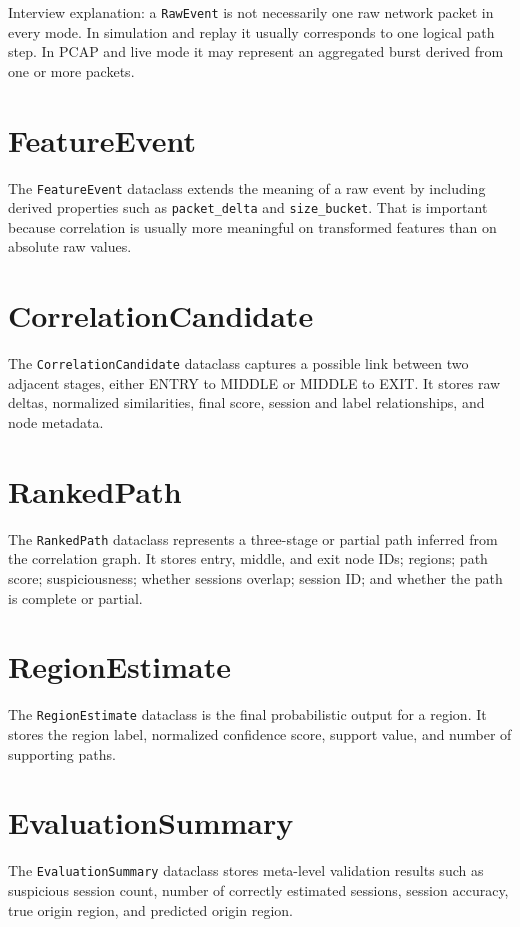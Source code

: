 \documentclass[12pt,a4paper]{report}
\begin{document}
Interview explanation: a \texttt{RawEvent} is not necessarily one raw network packet in every mode. In simulation and replay it usually corresponds to one logical path step. In PCAP and live mode it may represent an aggregated burst derived from one or more packets.

\section{FeatureEvent}
The \texttt{FeatureEvent} dataclass extends the meaning of a raw event by including derived properties such as \texttt{packet\_delta} and \texttt{size\_bucket}. That is important because correlation is usually more meaningful on transformed features than on absolute raw values.

\section{CorrelationCandidate}
The \texttt{CorrelationCandidate} dataclass captures a possible link between two adjacent stages, either ENTRY to MIDDLE or MIDDLE to EXIT. It stores raw deltas, normalized similarities, final score, session and label relationships, and node metadata.

\section{RankedPath}
The \texttt{RankedPath} dataclass represents a three-stage or partial path inferred from the correlation graph. It stores entry, middle, and exit node IDs; regions; path score; suspiciousness; whether sessions overlap; session ID; and whether the path is complete or partial.

\section{RegionEstimate}
The \texttt{RegionEstimate} dataclass is the final probabilistic output for a region. It stores the region label, normalized confidence score, support value, and number of supporting paths.

\section{EvaluationSummary}
The \texttt{EvaluationSummary} dataclass stores meta-level validation results such as suspicious session count, number of correctly estimated sessions, session accuracy, true origin region, and predicted origin region.
\end{document}

